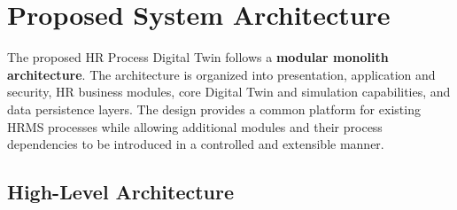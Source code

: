 \documentclass[12pt,a4paper]{article}
\begin{document}

\section{Proposed System Architecture}

The proposed HR Process Digital Twin follows a
\textbf{modular monolith architecture}. The architecture is
organized into presentation, application and security, HR business
modules, core Digital Twin and simulation capabilities, and data
persistence layers. The design provides a common platform for
existing HRMS processes while allowing additional modules and their
process dependencies to be introduced in a controlled and extensible
manner.

\subsection{High-Level Architecture}
\end{document}
